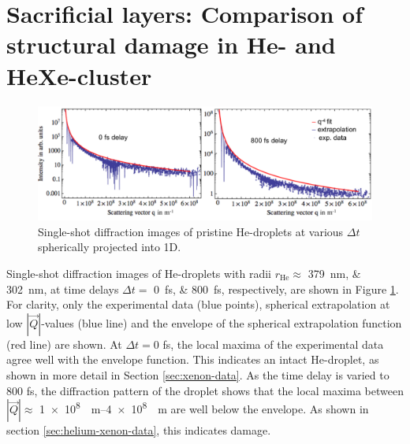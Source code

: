 \section{Sacrificial layers: Comparison of structural damage in He- and HeXe-cluster}\label{sec:comparison-of-He-and-HeXe-clusters}
\begin{figure}
	\centering
		\includegraphics[width=1.00\textwidth]{images/results/He-diffraction-patterns.pdf}
	\caption[Single-shot diffraction images of He-droplets at different time delays]{Single-shot diffraction images of pristine He-droplets at various $\Delta t$ spherically projected into 1D.}
	\label{fig:He-diffraction-patterns}
\end{figure}
Single-shot diffraction images of He-droplets with radii $r_{\text{He}}\approx$ \SIlist{379;302}{\nano\meter}, at time delays $\Delta t=$ \SIlist{0;800}{\femto\second}, respectively, are shown in Figure \ref{fig:He-diffraction-patterns}. For clarity, only the experimental data (blue points), spherical extrapolation at low $\left|\vec{Q}\right|$-values (blue line) and the envelope of the spherical extrapolation function (red line) are shown. At $\Delta t = 0$ fs, the local maxima of the experimental data agree well with the envelope function. This indicates an intact He-droplet, as shown in more detail in Section \ref{sec:xenon-data}. As the time delay is varied to $800$ fs, the diffraction pattern of the droplet shows that the local maxima between $\left|\vec{Q}\right| \approx$ \SIrange[scientific-notation=fixed, fixed-exponent=8]{1e8}{4e8}{\per\meter} are well below the envelope. As shown in section \ref{sec:helium-xenon-data}, this indicates damage.\\[1\baselineskip]
%
